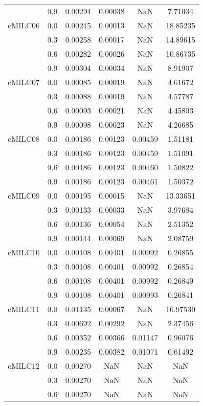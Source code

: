 \begin{longtable}{cccccc}
        & 0.9 & 0.00294 & 0.00038 & NaN & 7.71034 \\
cMILC06 & 0.0 & 0.00245 & 0.00013 & NaN & 18.85235 \\
        & 0.3 & 0.00258 & 0.00017 & NaN & 14.89615 \\
        & 0.6 & 0.00282 & 0.00026 & NaN & 10.86735 \\
        & 0.9 & 0.00304 & 0.00034 & NaN & 8.91907 \\
cMILC07 & 0.0 & 0.00085 & 0.00019 & NaN & 4.61672 \\
        & 0.3 & 0.00088 & 0.00019 & NaN & 4.57787 \\
        & 0.6 & 0.00093 & 0.00021 & NaN & 4.45803 \\
        & 0.9 & 0.00098 & 0.00023 & NaN & 4.26685 \\
cMILC08 & 0.0 & 0.00186 & 0.00123 & 0.00459 & 1.51181 \\
        & 0.3 & 0.00186 & 0.00123 & 0.00459 & 1.51091 \\
        & 0.6 & 0.00186 & 0.00123 & 0.00460 & 1.50822 \\
        & 0.9 & 0.00186 & 0.00123 & 0.00461 & 1.50372 \\
cMILC09 & 0.0 & 0.00195 & 0.00015 & NaN & 13.33651 \\
        & 0.3 & 0.00133 & 0.00033 & NaN & 3.97684 \\
        & 0.6 & 0.00136 & 0.00054 & NaN & 2.51352 \\
        & 0.9 & 0.00144 & 0.00069 & NaN & 2.08759 \\
cMILC10 & 0.0 & 0.00108 & 0.00401 & 0.00992 & 0.26855 \\
        & 0.3 & 0.00108 & 0.00401 & 0.00992 & 0.26854 \\
        & 0.6 & 0.00108 & 0.00401 & 0.00992 & 0.26849 \\
        & 0.9 & 0.00108 & 0.00401 & 0.00993 & 0.26841 \\
cMILC11 & 0.0 & 0.01135 & 0.00067 & NaN & 16.97539 \\
        & 0.3 & 0.00692 & 0.00292 & NaN & 2.37456 \\
        & 0.6 & 0.00352 & 0.00366 & 0.01147 & 0.96076 \\
        & 0.9 & 0.00235 & 0.00382 & 0.01071 & 0.61492 \\
cMILC12 & 0.0 & 0.00270 & NaN & NaN & NaN \\
        & 0.3 & 0.00270 & NaN & NaN & NaN \\
        & 0.6 & 0.00270 & NaN & NaN & NaN \\

\end{longtable}
